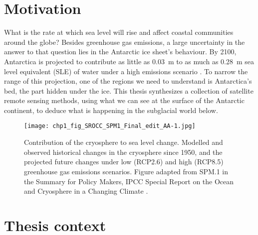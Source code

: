 
\section{Motivation}

What is the rate at which sea level will rise and affect coastal communities around the globe?
Besides greenhouse gas emissions, a large uncertainty in the answer to that question lies in the Antarctic ice sheet's behaviour.
By 2100, Antarctica is projected to contribute as little as \SI{0.03}{\metre} to as much as \SI{0.28}{\metre} sea level equivalent (\gls{SLE}) of water under a high emissions scenario \citep[RCP 8.5, Fig.~\ref{fig:0}f][]{PortnerSummaryPolicymakers2019}.
To narrow the range of this projection, one of the regions we need to understand is Antarctica's bed, the part hidden under the ice.
This thesis synthesizes a collection of satellite remote sensing methods, using what we can see at the surface of the Antarctic continent, to deduce what is happening in the subglacial world below.

\begin{figure}[htbp]
  \texttt{[image: chp1\_fig\_SROCC\_SPM1\_Final\_edit\_AA-1.jpg]}
  \caption[Cryospheric contribution to sea level change by 2100]{
    Contribution of the cryosphere to sea level change.
    Modelled and observed historical changes in the cryosphere since 1950, and the projected future changes under low (RCP2.6) and high (RCP8.5) greenhouse gas emissions scenarios.
    Figure adapted from SPM.1 in the Summary for Policy Makers, \gls{IPCC} Special Report on the Ocean and Cryosphere in a Changing Climate \citep{PortnerSummaryPolicymakers2019}.
  }
  \label{fig:0}
\end{figure}

\section{Thesis context}

